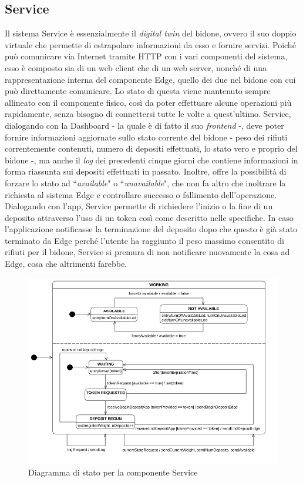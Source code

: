 \documentclass[a4paper, 12pt]{report}
\begin{document}
			\subsection{Service}
			Il sistema Service è essenzialmente il \textit{digital twin} del bidone, ovvero il suo
			doppio virtuale che permette di estrapolare informazioni da esso e fornire servizi. Poiché
			può comunicare via Internet tramite HTTP con i vari componenti del sistema, esso è composto
			sia di un web client che di un web server, nonché di una rappresentazione interna del
			componente Edge, quello dei due nel bidone con cui può direttamente comunicare. Lo
			stato di questa viene mantenuto sempre allineato con il componente fisico, così da poter
			effettuare alcune operazioni più rapidamente, senza bisogno di connettersi tutte le volte
			a quest'ultimo. Service, dialogando con la Dashboard - la quale è di fatto il suo
			\textit{frontend} -, deve poter fornire informazioni aggiornate sullo stato corrente del
			bidone - peso dei rifiuti correntemente contenuti, numero di depositi effettuati, lo stato
			vero e proprio del bidone -, ma anche il \textit{log} dei precedenti cinque giorni che
			contiene informazioni in forma riassunta sui depositi effettuati in passato. Inoltre, offre
			la possibilità di forzare lo stato ad ``\textit{available}" o ``\textit{unavailable}", che
			non fa altro che
			inoltrare la richiesta al sistema Edge e controllare successo o fallimento dell'operazione.
			\newline Dialogando con l'app, Service permette di richiedere l'inizio o la fine di un
			deposito attraverso l'uso di un token così come descritto nelle specifiche. In caso
			l'applicazione notificasse la terminazione del deposito dopo che questo è già stato terminato
			da Edge perché l'utente ha raggiunto il peso massimo consentito di rifiuti per il bidone,
			Service si premura di non notificare nuovamente la cosa ad Edge, cosa che altrimenti farebbe.
			\begin{figure}[H]
				\centering
				\includegraphics[width=\textwidth]{"img/ServiceStatechart.png"}    
				\caption{Diagramma di stato per la componente Service}
			\end{figure}
\end{document}
